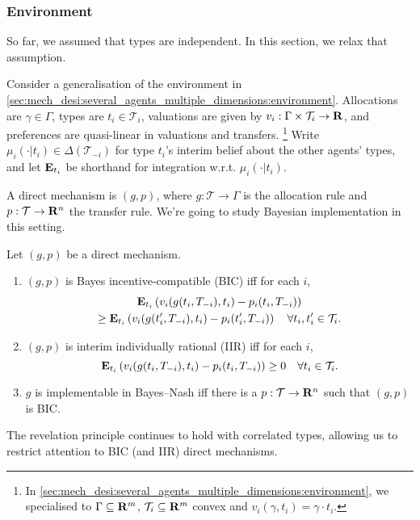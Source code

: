 \documentclass[11pt,letterpaper,reqno,oneside]{article}
\begin{document}
\subsubsection{Environment}
\label{sec:mech_desi:several_agents_correlated_types:environment}

So far, we assumed that types are independent. In this section, we relax that assumption.

Consider a generalisation of the environment in \cref{sec:mech_desi:several_agents_multiple_dimensions:environment}. Allocations are $\gamma \in \Gamma$, types are $t_i \in \mathcal{T}_i$, valuations are given by $v_i : \Gamma \times \mathcal{T}_i \to \mathbf{R}$, and preferences are quasi-linear in valuations and transfers.%
	\footnote{In \cref{sec:mech_desi:several_agents_multiple_dimensions:environment}, we specialised to $\Gamma \subseteq \mathbf{R}^m$, $\mathcal{T}_i \subseteq \mathbf{R}^m$ convex and $v_i(\gamma,t_i) = \gamma \cdot t_i$.}
Write $\mu_i(\cdot|t_i) \in \Delta(\mathcal{T}_{-i})$ for type $t_i$'s interim belief about the other agents' types, and let $\mathbf{E}_{t_i}$ be shorthand for integration w.r.t. $\mu_i(\cdot|t_i)$.

A direct mechanism is $(g,p)$, where $g : \mathcal{T} \to \Gamma$ is the allocation rule and $p : \mathcal{T} \to \mathbf{R}^n$ the transfer rule. We're going to study Bayesian implementation in this setting.
%
\begin{definition}
	Let $(g,p)$ be a direct mechanism.
	\begin{enumerate}

		\item $(g,p)$ is Bayes incentive-compatible (BIC) iff for each $i$,
		\begin{multline*}
			\mathbf{E}_{t_i}\left(
			v_i( g(t_i,T_{-i}), t_i ) - p_i(t_i,T_{-i})
			\right)
			\\
			\geq
			\mathbf{E}_{t_i}\left(
			v_i( g(t_i',T_{-i}), t_i ) - p_i(t_i',T_{-i})
			\right) 
			\quad\forall t_i, t_i' \in \mathcal{T}_i .
		\end{multline*}

		\item $(g,p)$ is interim individually rational (IIR) iff for each $i$,
		\begin{equation*}
			\mathbf{E}_{t_i}\left(
			v_i( g(t_i,T_{-i}), t_i ) - p_i(t_i,T_{-i})
			\right)
			\geq 0
			\quad\forall t_i \in \mathcal{T}_i .
		\end{equation*}

		\item $g$ is implementable in Bayes--Nash iff there is a $p : \mathcal{T} \to \mathbf{R}^n$ such that $(g,p)$ is BIC.

	\end{enumerate}
\end{definition}
%
\noindent The revelation principle continues to hold with correlated types, allowing us to restrict attention to BIC (and IIR) direct mechanisms.
\end{document}
